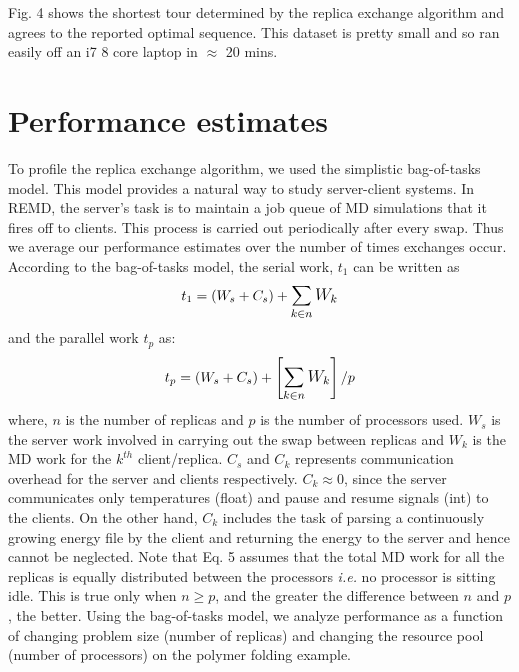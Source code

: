 \documentclass[12pt,letterpaper]{article}
\begin{document}
\noindent Fig. 4 shows the shortest tour determined by the replica exchange algorithm and agrees to the reported optimal sequence.\cite{tsp} This dataset is pretty small and so ran easily off an i7 8 core laptop in $\approx$ 20 mins.


\section*{Performance estimates}
\noindent To profile the replica exchange algorithm, we used the simplistic bag-of-tasks model. This model provides a natural way to study server-client systems. In REMD, the server's task is to maintain a job queue of MD simulations that it fires off to clients. This process is carried out periodically after every swap. Thus we average our performance estimates over the number of times exchanges occur. According to the bag-of-tasks model, the serial work, $t_1$ can be written as
%
\begin{equation}
t_1 = \left( W_s + C_s \right) + \mathlarger{\sum_{k \in n} W_k}
\end{equation}
%
and the parallel work $t_p$ as:
%
\begin{equation}
t_p = \left( W_s + C_s \right) + \left[ \mathlarger{\sum_{k \in n} W_k} \right] / p
\end{equation}
% 
where, $n$ is the number of replicas and $p$ is the number of processors used. $W_s$ is the server work involved in carrying out the swap between replicas and $W_k$ is the MD work for the $k^{th}$ client/replica. $C_s$ and $C_k$ represents communication overhead for the server and clients respectively. $C_k \approx 0 $, since the server communicates only temperatures (float) and pause and resume signals (int) to the clients. On the other hand, $C_k$ includes the task of parsing a continuously growing energy file by the client and returning the energy to the server and hence cannot be neglected. Note that Eq. 5 assumes that the total MD work for all the replicas is equally distributed between the processors \textit{i.e.} no processor is sitting idle. This is true only when $n \geq p$, and the greater the difference between $n$ and $p$, the better. Using the bag-of-tasks model, we analyze performance as a function of changing problem size (number of replicas) and changing the resource pool (number of processors) on the polymer folding example. 
%
\end{document}

